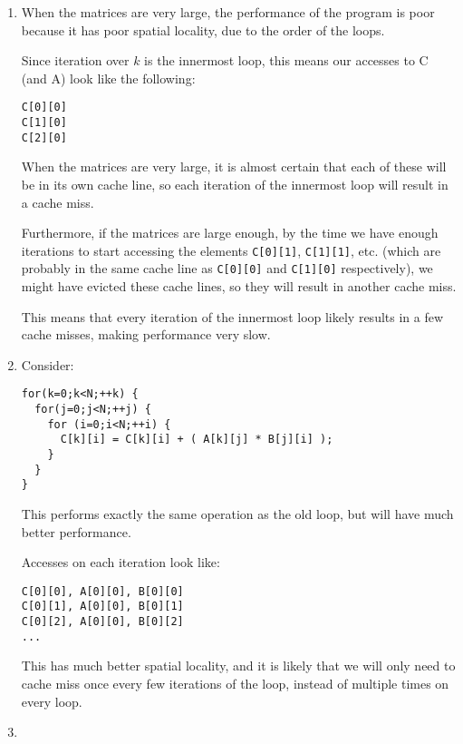 


\begin{enumerate}[label=(\alph*)]

  \item
    When the matrices are very large, the performance of the program is poor because it has poor spatial locality, due to the order of the loops.

    Since iteration over $k$ is the innermost loop, this means our accesses to C (and A) look like the following:

\begin{verbatim}
C[0][0]
C[1][0]
C[2][0]
\end{verbatim}

   When the matrices are very large, it is almost certain that each of these will be in its own cache line, so each iteration of the innermost loop will result in a cache miss.

   Furthermore, if the matrices are large enough, by the time we have enough iterations to start accessing the elements \texttt{C[0][1]}, \texttt{C[1][1]}, etc. (which are probably in the same cache line as \texttt{C[0][0]} and \texttt{C[1][0]} respectively), we might have evicted these cache lines, so they will result in another cache miss.

   This means that every iteration of the innermost loop likely results in a few cache misses, making performance very slow.

   \item
     Consider:

\begin{verbatim}
for(k=0;k<N;++k) {
  for(j=0;j<N;++j) {
    for (i=0;i<N;++i) {
      C[k][i] = C[k][i] + ( A[k][j] * B[j][i] );
    }
  }
}
\end{verbatim}

This performs exactly the same operation as the old loop, but will have much better performance.

Accesses on each iteration look like:

\begin{verbatim}
C[0][0], A[0][0], B[0][0]
C[0][1], A[0][0], B[0][1]
C[0][2], A[0][0], B[0][2]
...
\end{verbatim}

This has much better spatial locality, and it is likely that we will only need to cache miss once every few iterations of the loop, instead of multiple times on every loop.

\item


\end{enumerate}
